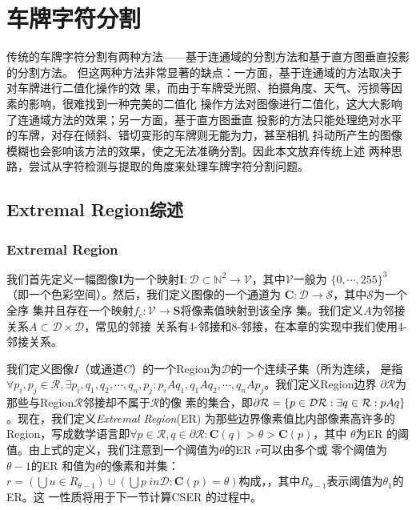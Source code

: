 \chapter{车牌字符分割}

传统的车牌字符分割有两种方法——基于连通域的分割方法和基于直方图垂直投影的分割方法。
但这两种方法非常显著的缺点：一方面，基于连通域的方法取决于对车牌进行二值化操作的效
果，而由于车牌受光照、拍摄角度、天气、污损等因素的影响，很难找到一种完美的二值化
操作方法对图像进行二值化，这大大影响了连通域方法的效果；另一方面，基于直方图垂直
投影的方法只能处理绝对水平的车牌，对存在倾斜、错切变形的车牌则无能为力，甚至相机
抖动所产生的图像模糊也会影响该方法的效果，使之无法准确分割。因此本文放弃传统上述
两种思路，尝试从字符检测与提取的角度来处理车牌字符分割问题。

\section{Extremal Region综述}

\subsection{Extremal Region}

我们首先定义一幅图像$\mathbf{I}$为一个映射$\mathbf{I} : \mathcal{D} \subset
\mathbb{N}^2 \rightarrow \mathcal{V}$，其中$\mathcal{V}$一般为
$\{0,\cdots,255\}^3$（即一个色彩空间）。然后，我们定义图像的一个通道为
$\mathbf{C} : \mathcal{D} \rightarrow \mathcal{S}$，其中$\mathcal{S}$为一个全序
集并且存在一个映射$f_c : \mathcal{V} \rightarrow \mathbf{S}$将像素值映射到该全序
集。我们定义$A$为邻接关系$A \subset \mathcal{D} \times \mathcal{D}$，常见的邻接
关系有4-邻接和8-邻接，在本章的实现中我们使用4-邻接关系。

我们定义图像$I$（或通道$C$）的一个Region为$\mathcal{D}$的一个连续子集（所为连续，
是指$\forall{p_i, p_j \in \mathcal{R}}, \exists{p_i, q_1, q_2, \cdots, q_n,
  p_j} : p_iAq_1, q_1Aq_2,\cdots,q_nAp_j$。我们定义Region边界
$\partial{\mathcal{R}}$为那些与Region$\mathcal{R}$邻接却不属于$\mathcal{R}$的像
素的集合，即$\partial{\mathcal{R}} = \{p \in \mathcal{D} \\ \mathcal{R} :
\exists{q \in \mathcal{R}} : pAq \}$。现在，我们定义\textit{Extremal Region}(ER)
为那些边界像素值比内部像素高许多的Region，写成数学语言即$\forall{p \in
  \mathcal{R}}, q \in \partial{\mathcal{R}} : \mathbf{C}(q) > \theta > \mathbf{C}(p)$，其中
$\theta$为ER 的阈值。由上式的定义，我们注意到一个阈值为$\theta$的ER $r$可以由多个或
零个阈值为$\theta - 1$的ER 和值为$\theta$的像素和并集：$r = \left( \bigcup{u \in
    R_{\theta-1}} \right) \cup \left( \bigcup{p \ in \mathcal{D} : \mathbf{C}(p)
  = \theta} \right)$构成，，其中\(R_{\theta-1}\)表示阈值为\(\theta_1\)的 ER。这
一性质将用于下一节计算CSER 的过程中。

